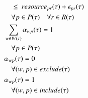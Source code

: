 \begin{alignat}{2}
	& \quad \leq \ \ParStrategicResource + \VarStrategicExcess \notag                                                                                                                                                                                                                                          \\ 
	& \quad \forall \ElementPeriod \in \SetPeriod \quad \forall \ElementResource \in \SetResource                                                                                                                  \label{eqn:capacity_constraint}                                                             \\
	& \sum_{\ElementWorkOrder \in \SetWorkOrder{}} \VarStrategicWorkOrderAssignment{\ElementWorkOrder}{\ElementPeriod} = 1 \notag                                                                                                                                                                              \\
	& \quad \forall \ElementPeriod \in \SetPeriod                      \label{eqn:single_workorder_constraint}                                                                                                                                                                                                 \\
	& \VarStrategicWorkOrderAssignment{\ElementWorkOrder}{\ElementPeriod} = 0 \notag                                                                                                                                                                                                                           \\
	& \quad \forall (\ElementWorkOrder, \ElementPeriod) \in \ParStrategicExclude                          \label{eqn:exclusion_constraint}                                                                                                                                                                     \\
	& \VarStrategicWorkOrderAssignment{\ElementWorkOrder}{\ElementPeriod} = 1 \notag                                                                                                                                                                                                                           \\ 
	& \quad \forall (\ElementWorkOrder, \ElementPeriod) \in \ParStrategicInclude                          \label{eqn:inclusion_constraint}                                                                                                                                                                     \\

\end{alignat}
